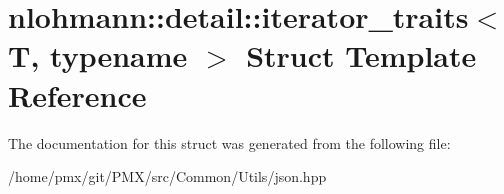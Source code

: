 \hypertarget{structnlohmann_1_1detail_1_1iterator__traits}{}\section{nlohmann\+:\+:detail\+:\+:iterator\+\_\+traits$<$ T, typename $>$ Struct Template Reference}
\label{structnlohmann_1_1detail_1_1iterator__traits}


The documentation for this struct was generated from the following file\+:\begin{DoxyCompactItemize}
\item 
/home/pmx/git/\+P\+M\+X/src/\+Common/\+Utils/json.\+hpp\end{DoxyCompactItemize}
